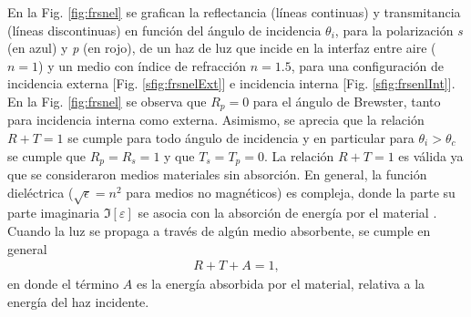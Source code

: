 En la Fig. \ref{fig:frsnel} se grafican la reflectancia (líneas continuas) y transmitancia (líneas discontinuas) en función del ángulo de incidencia $\theta_i$, para la polarización \emph{s} (en azul) y \emph{p} (en rojo), de un haz de luz que incide en la interfaz entre aire ($n=1$) y un medio con índice de refracción $n=1.5$, para una configuración de incidencia externa [Fig. \ref{sfig:frsnelExt}] e incidencia interna [Fig. \ref{sfig:frsenlInt}]. En la Fig. \ref{fig:frsnel} se observa que $R_p=0$ para el ángulo de Brewster, tanto para incidencia interna como externa. Asimismo, se aprecia que la relación $R+T=1$ se cumple para todo ángulo de incidencia y en particular para $\theta_i>\theta_c$ se cumple que $R_p = R_s = 1$ y que $T_s = T_p = 0$. La relación $R+T=1$ es válida ya que se consideraron medios materiales sin absorción. En general, la función dieléctrica ($\sqrt{\epsilon}=n^2$ para medios no magnéticos) es compleja, donde la parte su parte imaginaria   $\Im[\varepsilon]$ se asocia con la absorción de energía por el material \cite{ibach2003solid}. Cuando la luz se propaga a través de algún medio absorbente, se cumple en general 
	\begin{align*}
	R + T + A = 1,
	\end{align*}
en donde el término $A$ es la energía absorbida por el material, relativa a la energía del haz incidente.
%
